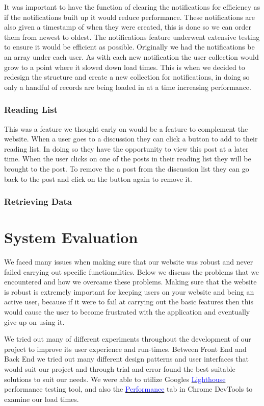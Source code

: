 It was important to have the function of clearing the notifications for efficiency as if the notifications built up it would reduce performance. These notifications are also given a timestamp of when they were created, this is done so we can order them from newest to oldest. The notifications feature underwent extensive testing to ensure it would be efficient as possible. Originally we had the notifications be an array under each user. As with each new notification the user collection would grow to a point where it slowed down load times. This is when we decided to redesign the structure and create a new collection for notifications, in doing so only a handful of records are being loaded in at a time increasing performance.

\subsection{Reading List}
This was a feature we thought early on would be a feature to complement the website. When a user goes to a discussion they can click a button to add to their reading list. In doing so they have the opportunity to view this post at a later time. When the user clicks on one of the posts in their reading list they will be brought to the post.
To remove the a post from the discussion list they can go back to the post and click on the button again to remove it.
\subsection{Retrieving Data}
\chapter{System Evaluation}

We faced many issues when making sure that our website was robust and never failed carrying out specific functionalities. Below we discuss the problems that we encountered and how we overcame these problems. Making sure that the website is robust is extremely important for keeping users on your website and being an active user, because if it were to fail at carrying out the basic features then this would cause the user to become frustrated with the application and eventually give up on using it.
\newline

We tried out many of different experiments throughout the development of our project to improve its user experience and run-times. Between Front End and Back End we tried out many different design patterns and user interfaces that would suit our project and through trial and error found the best suitable solutions to suit our needs. We were able to utilize Googles \href{https://developers.google.com/web/tools/lighthouse/}{\textcolor{blue}{Lighthouse}} performance testing tool, and also the \href{https://developer.chrome.com/docs/devtools/evaluate-performance/}{\textcolor{blue}{Performance}} tab in Chrome DevTools to examine our load times.
\newline

